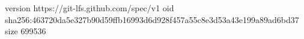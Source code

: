 version https://git-lfs.github.com/spec/v1
oid sha256:463720da5e327b90d59ffb16993d6d928f457a55c8e3d53a43e199a89ad6bd37
size 699536
